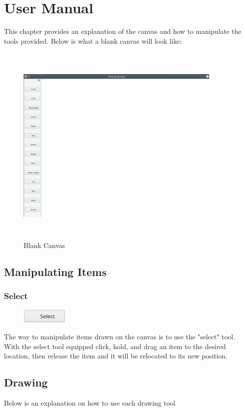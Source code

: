 \chapter{User Manual}
This chapter provides an explanation of the canvas and how to manipulate the tools provided. Below is what a blank canvas will look like:
\begin{figure}[h!]
\centering
\includegraphics[height=10cm, width=10cm]{canvas}
\caption{Blank Canvas}
\end{figure}

\section{Manipulating Items}
\subsection{Select}
\begin{figure}[h!]
\includegraphics{select}
\end{figure}
  The way to manipulate items drawn on the canvas is to use the "select" tool. With the select tool equipped click, hold, and drag an item to the desired location, then release the item and it will be relocated to its new position.


\section{Drawing}
Below is an explanation on how to use each drawing tool


